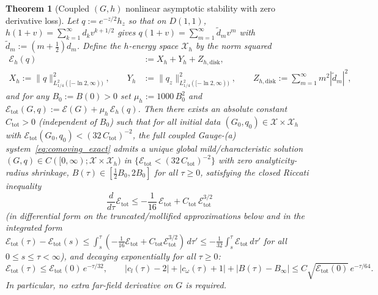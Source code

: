 \documentclass[11pt,a4paper]{article}
\newtheorem{thm}{Theorem}
\begin{document}
\begin{thm}[Coupled $(G,h)$ nonlinear asymptotic stability with zero derivative loss]\label{thm:coupled_h}
Let $q := e^{-z/2}h_z$ so that on $D(1,1)$, $h(1+v)=\sum_{k=1}^\infty d_k v^{k+1/2}$ gives
$q(1+v)=\sum_{m=1}^\infty \tilde{d}_m v^m$ with $\tilde{d}_m := (m+\tfrac12)d_m$.
Define the $h$-energy space $\mathcal{X}_h$ by the norm squared
\begin{align*}
\mathcal{E}_h(q) &:= X_h + Y_h + Z_{h,\mathrm{disk}}, \\
X_h := \|q\|_{L^2_{1/4}([-\ln 2,\infty))}^2,\qquad
Y_h &:= \|q_z\|_{L^2_{1/4}([-\ln 2,\infty))}^2,\qquad
Z_{h,\mathrm{disk}} := \sum_{m=1}^\infty m^2|\tilde{d}_m|^2,
\end{align*}
and for any $B_0 := B(0) > 0$ set $\mu_h := 1000\,B_0^2$ and
$\mathcal{E}_{\mathrm{tot}}(G,q) := \mathcal{E}(G) + \mu_h\,\mathcal{E}_h(q)$.
Then there exists an absolute constant $C_{\mathrm{tot}} > 0$ (independent of $B_0$) such that for all initial data
$(G_0, q_0) \in \mathcal{X} \times \mathcal{X}_h$ with $\mathcal{E}_{\mathrm{tot}}(G_0, q_0) < (32\,C_{\mathrm{tot}})^{-2}$,
the full coupled Gauge-(a) system~\eqref{eq:comoving_exact} admits a unique global mild/characteristic
solution $(G, q) \in C([0,\infty); \mathcal{X}\times\mathcal{X}_h)$ in $\{\mathcal{E}_{\mathrm{tot}} < (32\,C_{\mathrm{tot}})^{-2}\}$
with zero analyticity-radius shrinkage, $B(\tau) \in [\tfrac12 B_0, 2 B_0]$ for all $\tau\ge 0$, satisfying the closed Riccati inequality
\[
\frac{d}{d\tau}\mathcal{E}_{\mathrm{tot}} \le -\frac{1}{16}\,\mathcal{E}_{\mathrm{tot}} + C_{\mathrm{tot}}\,\mathcal{E}_{\mathrm{tot}}^{3/2}
\]
(in differential form on the truncated/mollified approximations below and in the integrated form
$\mathcal{E}_{\mathrm{tot}}(\tau)-\mathcal{E}_{\mathrm{tot}}(s)\le\int_s^\tau(-\frac{1}{16}\mathcal{E}_{\mathrm{tot}}+C_{\mathrm{tot}}\mathcal{E}_{\mathrm{tot}}^{3/2})\,d\tau'\le -\frac{1}{32}\int_s^\tau\mathcal{E}_{\mathrm{tot}}\,d\tau'$
for all $0\le s\le\tau<\infty$), and decaying exponentially for all $\tau\ge 0$:
\[
\mathcal{E}_{\mathrm{tot}}(\tau) \le \mathcal{E}_{\mathrm{tot}}(0)\,e^{-\tau/32},
\qquad
|c_l(\tau)-2| + |c_\omega(\tau)+1| + |B(\tau)-B_\infty| \le C\sqrt{\mathcal{E}_{\mathrm{tot}}(0)}\,e^{-\tau/64}.
\]
In particular, no extra far-field derivative on $G$ is required.
\end{thm}
\end{document}
